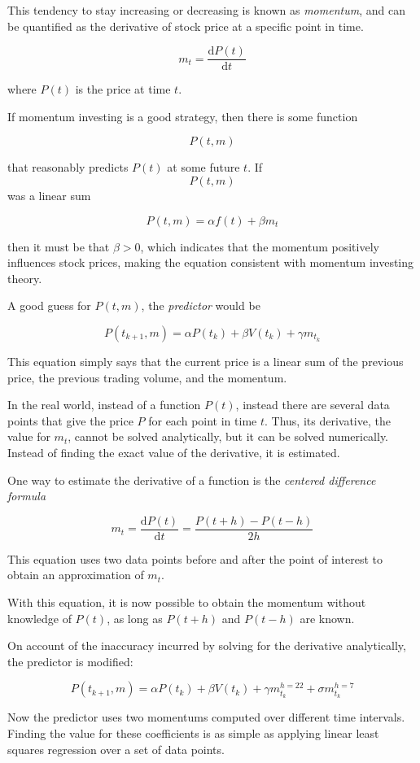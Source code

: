 \documentclass[8pt]{article}
\newcommand*{\deriv}{\ensuremath{\mathrm{d}}}
\begin{document}
	This tendency to stay increasing or decreasing is known as \textit{momentum}, and can be quantified as the derivative of stock price at a specific point in time.

	$$ m_{t} = \frac{\deriv P(t)}{\deriv t} $$

	where $P(t)$ is the price at time $t$.

	If momentum investing is a good strategy, then there is some function

	$$ P(t, m) $$

	that reasonably predicts $P(t)$ at some future $t$. If $$P(t,m)$$ was a 
	linear sum 

	$$ P(t,m) = \alpha f(t) + \beta m_{t} $$

	then it must be that $\beta > 0$, which indicates that the momentum 
	positively influences stock prices, making the equation consistent with 
	momentum investing theory.

	A good guess for $P(t,m)$, the \textit{predictor} would be 

	$$ P(t_{k+1},m) = \alpha P(t_{k}) + \beta V(t_{k}) + \gamma m_{t_k}$$

	This equation simply says that the current price is a linear sum of the previous price, the previous trading volume, and the momentum.

	In the real world, instead of a function $P(t)$, instead there are several data points that give the price $P$ for each point in time $t$.
	Thus, its derivative, the value for $m_{t}$, cannot be solved analytically, but it can be solved numerically.
	Instead of finding the exact value of the derivative, it is estimated.

	One way to estimate the derivative of a function is the \textit{centered difference formula}

	$$ m_{t} = \frac{\deriv P(t)}{\deriv t} = \frac{P(t+h) - P(t-h)}{2h} $$

	This equation uses two data points before and after the point of interest to obtain an approximation of $m_{t}$.

	With this equation, it is now possible to obtain the momentum without knowledge of $P(t)$, as long as $P(t+h)$ and $P(t-h)$ are known.

	On account of the inaccuracy incurred by solving for the derivative analytically, the predictor is modified:

	$$ P(t_{k+1},m) = \alpha P(t_{k}) + \beta V(t_{k}) +
	\gamma m^{h=22}_{t_k} + \sigma m^{h=7}_{t_k}$$

	Now the predictor uses two momentums computed over different time intervals.
	Finding the value for these coefficients is as simple as applying linear least squares regression over a set of data points.
\end{document}
